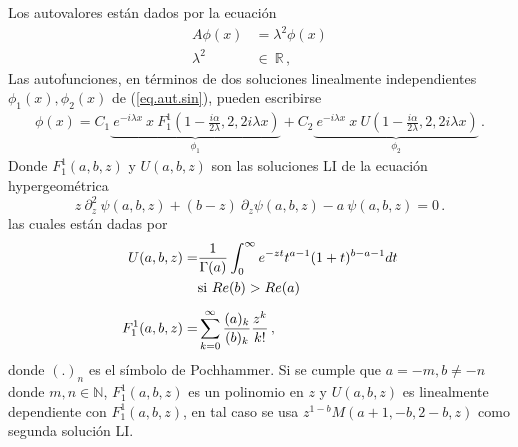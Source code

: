 Los autovalores están dados por la ecuación 
\begin{equation}
\begin{aligned}
    A  \phi (x)  &=   \lambda ^2 \phi (x) \\[5pt]
    \lambda ^2 \ &\in \ \mathbb{R}  
    \, ,
\end{aligned}
\label{eq.aut.sin}
\end{equation}
Las autofunciones, en términos de dos soluciones linealmente independientes $\phi _1 (x), \phi _2 (x)$ de (\ref{eq.aut.sin}), pueden escribirse
\begin{equation}
\begin{aligned}
    \phi (x) =
	    C _1
    	\underbrace{
				     \ e ^{-i \lambda x} \ x \ 
				     F _{1} ^{1} 
				     		\left(  
				     			1 - \frac{i \alpha}
				     			{2\lambda}
				     		,2,2 i \lambda x \right) 
				     } _ {\phi_1} + 
      C _2 
      \underbrace{ 
      			   \ e^{-i \lambda x } \ x \ 
      			   U 
      			   	\left( 
      			   		1- \frac{i \alpha}{2 \lambda}
      			   		,2,2 i \lambda x \right) } _{\phi_2} 
    \, . 
\end{aligned}
\label{eq.phi}
\end{equation}
Donde $F _1 ^1(a,b,z)$ y $ U(a,b,z)$ son las soluciones LI de la ecuación hypergeométrica
\begin{equation}
    z \ \partial ^2 _z \ \psi (a,b,z) + (b-z) \
    \partial _z \psi (a,b,z)
    -a \ \psi (a,b,z) = 0 \, .
\end{equation}
las cuales están dadas por \cite{Abramowitz:hyper}
\begin{align}
	U(a,b,z) = &\frac{1}{\Gamma (a)} 
	\int _0 ^{\infty} e ^{-zt}
	t ^{a-1}
	(1+t) ^{b-a-1}
	dt \\
	& {\rm si \ } Re (b) > Re(a) 
	\nonumber
	\\[5pt]
	F _1 ^1 (a,b,z) =& \sum _ {k=0} ^{\infty} 
	\frac{(a) _k}{(b) _k} 
	\frac{z ^k}{k!} 
	\, ,
\end{align}
donde $(.) _n$ es el símbolo de Pochhammer.
Si se cumple que  $a=-m,b \neq -n$ donde $ m,n \in \mathbb{N}$, $F _1 ^1 (a,b,z)$ es un polinomio en $z$ y $U(a,b,z)$ es linealmente dependiente con $F _1 ^1 (a,b,z)$, en tal caso se usa $z^{1-b} M(a+1,-b,2-b,z)$ como segunda solución LI.


